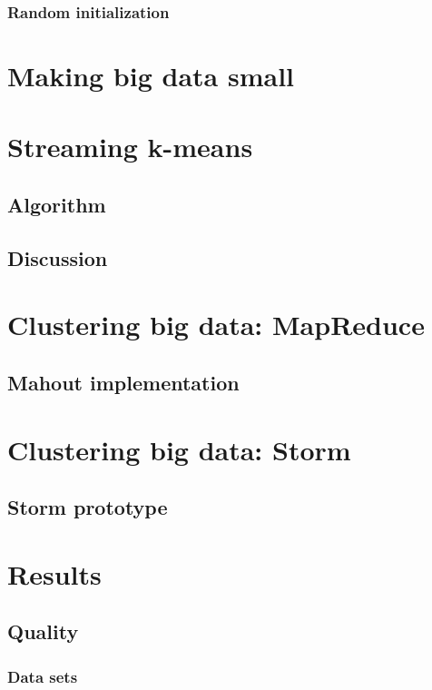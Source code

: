 \documentclass{article}
\begin{document}
\subsubsection{Random initialization}


\section{Making big data small}

\section{Streaming k-means}

\subsection{Algorithm}

\subsection{Discussion}

\section{Clustering big data: MapReduce}

\subsection{Mahout implementation}

\section{Clustering big data: Storm}

\subsection{Storm prototype}

\section{Results}

\subsection{Quality}

\subsubsection{Data sets}
\end{document}
